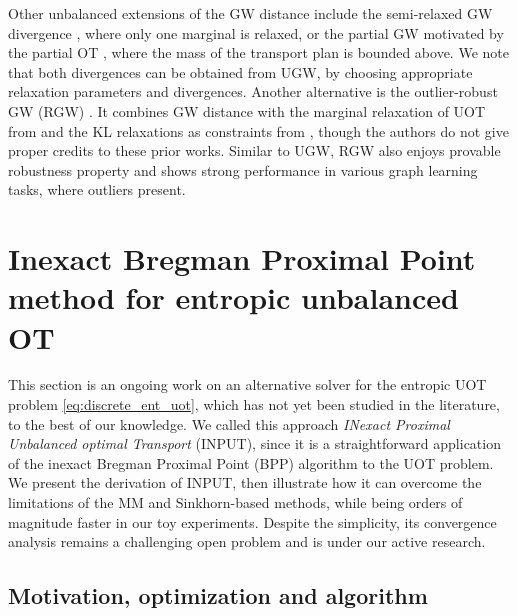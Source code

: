 Other unbalanced extensions of the GW distance include the semi-relaxed GW divergence \citep{Vincent22},
where only one marginal is relaxed, or the partial GW \citep{Chapel20}
motivated by the partial OT \citep{Caffarelli10, Figalli10}, where the mass of the transport plan
is bounded above. We note that both divergences can be obtained from UGW,
by choosing appropriate relaxation parameters and divergences.
Another alternative is the outlier-robust GW (RGW) \citep{Kong23}. It combines GW distance with
the marginal relaxation of UOT from \citep{Liero18} and
the KL relaxations as constraints from \citep{Balaji20},
though the authors do not give proper credits to these prior works.
Similar to UGW, RGW also enjoys provable robustness property and shows strong performance
in various graph learning tasks, where outliers present.

\section{Inexact Bregman Proximal Point method for entropic unbalanced OT}
\label{sec:input}

This section is an ongoing work on an alternative solver for the entropic UOT problem
\ref{eq:discrete_ent_uot}, which has not yet been studied in the literature,
to the best of our knowledge.
We called this approach \textit{INexact Proximal Unbalanced optimal Transport} (INPUT),
since it is a straightforward application of the inexact Bregman Proximal Point (BPP) algorithm
to the UOT problem. We present the derivation of INPUT, then illustrate how
it can overcome the limitations of the MM and Sinkhorn-based methods,
while being orders of magnitude faster in our toy experiments. Despite the simplicity,
its convergence analysis remains a challenging open problem and is under our active research.

\subsection{Motivation, optimization and algorithm}

